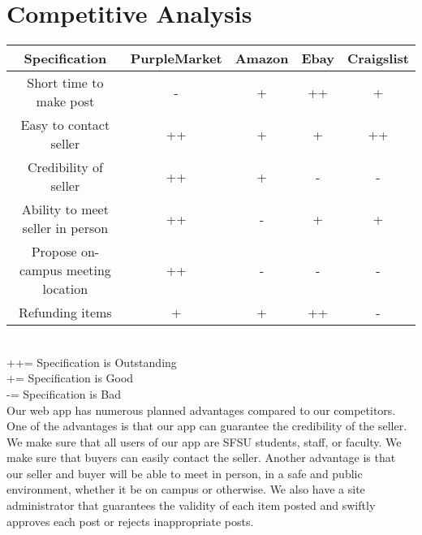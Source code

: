 \section{Competitive Analysis}

\begin{spacing}{1.25}
\begin{tabular}{ | c | c | c | c | c | }
\hline
Specification 						& PurpleMarket 			& Amazon 				& Ebay 					& Craigslist\\\hline
Short time to make post 			& \cellcolor{red}-		& \cellcolor{yellow}+	& \cellcolor{green}++	& \cellcolor{yellow}+\\\hline
Easy to contact seller	 			& \cellcolor{green}++	& \cellcolor{yellow}+	& \cellcolor{yellow}+	& \cellcolor{green}++\\\hline
Credibility of seller	 			& \cellcolor{green}++	& \cellcolor{yellow}+	& \cellcolor{red}-		& \cellcolor{red}-\\\hline
Ability to meet seller in person	& \cellcolor{green}++	& \cellcolor{red}-		& \cellcolor{yellow}+	& \cellcolor{yellow}+\\\hline
Propose on-campus meeting location 	& \cellcolor{green}++	& \cellcolor{red}-		& \cellcolor{red}-		& \cellcolor{red}-\\\hline
Refunding items					 	& \cellcolor{yellow}+	& \cellcolor{yellow}+	& \cellcolor{green}++	& \cellcolor{red}-\\\hline
\end{tabular}\\
++\tabto{7mm}= Specification is Outstanding\\
+\tabto{7mm}= Specification is Good\\
-\tabto{7mm}= Specification is Bad\\

Our web app has numerous planned advantages compared to our competitors. One of the advantages is that our app can guarantee the credibility of the seller. We make sure that all users of our app are SFSU students, staff, or faculty. We make sure that buyers can easily contact the seller. Another advantage is that our seller and buyer will be able to meet in person, in a safe and public environment, whether it be on campus or otherwise. We also have a site administrator that guarantees the validity of each item posted and swiftly approves each post or rejects inappropriate posts.
\end{spacing}